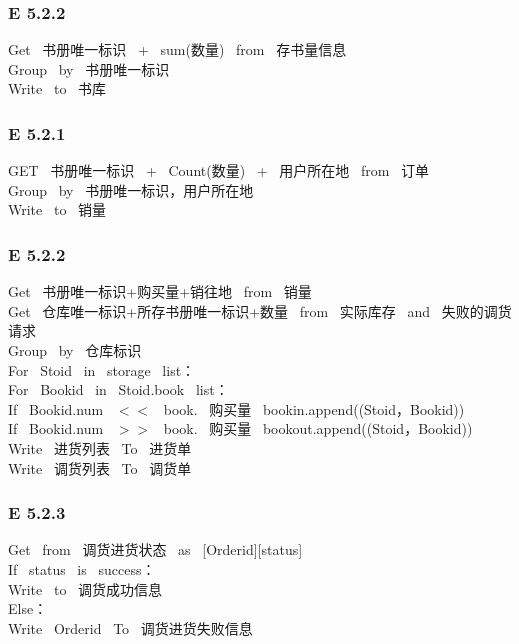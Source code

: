 \subsubsection*{E 5.2.2}
Get \ 书册唯一标识 \ + \ sum(数量) \ from \ 存书量信息 \\ 
Group \ by \ 书册唯一标识\\ 
Write \ to \ 书库\\ 
\vspace{-1mm}
\subsubsection*{E 5.2.1}
GET \ 书册唯一标识 \ + \ Count(数量) \ + \ 用户所在地 \ from \ 订单 \\ 
Group \ by \ 书册唯一标识，用户所在地\\ 
Write \ to \ 销量\\ 
\vspace{-1mm}
\subsubsection*{E 5.2.2}
Get \ 书册唯一标识+购买量+销往地 \ from \ 销量\\ 
Get \ 仓库唯一标识+所存书册唯一标识+数量 \ from \ 实际库存 \ and \ 失败的调货请求 \\ 
Group \ by \ 仓库标识\\ 
For \ Stoid \ in \ storage \ list：\\ 
For \ Bookid \ in \ Stoid.book \ list：\\ 
If \ Bookid.num \ $<<$ \ book. \ 购买量 \ bookin.append((Stoid，Bookid))\\ 
If \ Bookid.num \ $>>$ \ book. \ 购买量 \ bookout.append((Stoid，Bookid)) \\ 
Write \ 进货列表 \ To \ 进货单\\ 
Write \ 调货列表 \ To \ 调货单\\ 
\vspace{-1mm}
\subsubsection*{E 5.2.3}
Get \ from \ 调货进货状态 \ as \ [Orderid][status] \\ 
If \ status \ is \ success：\\ 
Write \ to \ 调货成功信息\\ 
Else：\\ 
Write \ Orderid \ To \ 调货进货失败信息\\ 
\vspace{-1mm}
